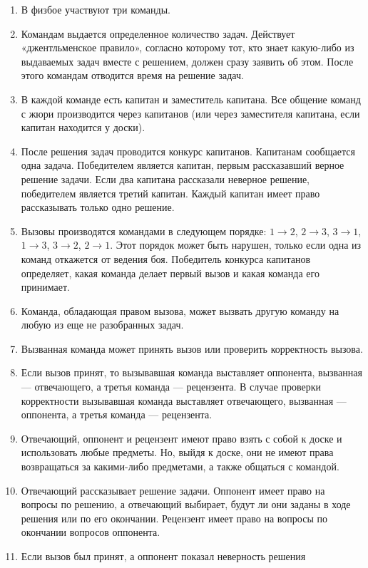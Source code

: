 \documentclass[11pt]{article}
\newlength{\h}
\begin{document}
\begin{enumerate}
\setlength{\itemsep}{-1mm}
\item В физбое участвуют три команды.
\item Командам выдается определенное количество задач. Действует
  «джентльменское правило», согласно которому тот, кто знает
  какую-либо из выдаваемых задач вместе с решением, должен сразу
  заявить об этом. После этого командам отводится время на решение
  задач.
\item В каждой команде есть капитан и заместитель капитана. Все
  общение команд с жюри производится через капитанов (или через
  заместителя капитана, если капитан находится у доски).
\item После решения задач проводится конкурс капитанов. Капитанам
  сообщается одна задача. Победителем является капитан, первым
  рассказавший верное решение задачи. Если два капитана рассказали
  неверное решение, победителем является третий капитан. Каждый
  капитан имеет право рассказывать только одно решение.
\item Вызовы производятся командами в следующем порядке: $1
  \rightarrow 2$, $2 \rightarrow3$, $3 \rightarrow 1$, $1
  \rightarrow 3$, $3 \rightarrow 2$, $2 \rightarrow 1$. Этот
  порядок может быть нарушен, только если одна из команд откажется от
  ведения боя. Победитель конкурса капитанов определяет, какая команда
  делает первый вызов и какая команда его принимает.
\item Команда, обладающая правом вызова, может вызвать другую команду
  на любую из еще не разобранных задач.
\item Вызванная команда может принять вызов или проверить корректность
  вызова.
\item Если вызов принят, то вызывавшая команда выставляет оппонента,
  вызванная --- отвечающего, а третья команда --- рецензента. В случае
  проверки корректности вызывавшая команда выставляет отвечающего,
  вызванная --- оппонента, а третья команда --- рецензента.
\item Отвечающий, оппонент и рецензент имеют право взять с собой к
  доске и использовать любые предметы. Но, выйдя к доске, они не имеют
  права возвращаться за какими-либо предметами, а также общаться с
  командой.
\item Отвечающий рассказывает решение задачи. Оппонент имеет право на
  вопросы по решению, а отвечающий выбирает, будут ли они заданы в
  ходе решения или по его окончании. Рецензент имеет право на вопросы
  по окончании вопросов оппонента.
\item Если вызов был принят, а оппонент показал неверность решения

\end{enumerate}
\end{document}
